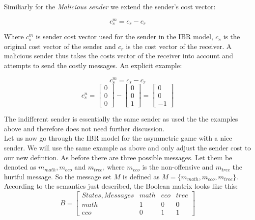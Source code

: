 \documentclass{article}
\begin{document}
Similiarly for the \textit{Malicious sender} we extend the sender's cost vector:

\begin{equation*}
c_s^m= c_s - c_r
\end{equation*}

Where $c_s^m$ is sender cost vector used for the sender in the IBR model, $c_s$ is the original cost vector of the sender and $c_r$ is the cost vector of the receiver. A malicious sender thus takes the costs vector of the receiver into account and attempts to send the costly messages. An explicit example:

\begin{equation*}
c_s^m= c_s - c_r
\end{equation*}
\begin{equation*}
c_s^n=
\begin{bmatrix}
0 \\
0 \\
0
\end{bmatrix}
-
\begin{bmatrix}
0 \\
0 \\
1
\end{bmatrix}
=
\begin{bmatrix}
0 \\
0 \\
-1
\end{bmatrix}
\end{equation*}

The indifferent sender is essentially the same sender as used the the examples above and therefore does not need further discussion. \\

Let us now go through the IBR model for the asymmetric game with a nice sender. We will use the same example as above and only adjust the sender cost to our new defintion. As before there are three possible messages. Let them be denoted as $m_{math},m_{eco}$ and $m_{tree}$, where $m_{eco}$ is the non-offensive and $m_{tree}$ the hurtful message. So the message set $M$ is defined as $M=\{m_{math},m_{eco},m_{tree}\}$. According to the semantics just described, the Boolean matrix looks like this:\\
\begin{equation*}
B =
\begin{bmatrix}

States, Messages & math & eco & tree \\
math             & 1    & 0   & 0    \\
eco              & 0    & 1   & 1
\end{bmatrix}
\end{equation*}
\end{document}
